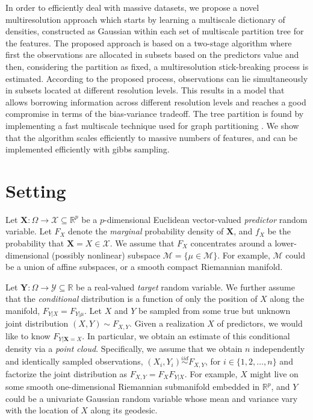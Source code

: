 \documentclass{article}
\newcommand{\iid}{\overset{iid}{\sim}}
\newcommand{\mbX}{\mathbf{X}}
\newcommand{\mbY}{\mathbf{Y}}
\newcommand{\Real}{\mathbb{R}}
\providecommand{\mc}[1]{\mathcal{#1}}
\newcommand{\from}{{\ensuremath{\colon}}}           %
\begin{document}
 In order to efficiently deal with massive datasets, we propose a novel multiresolution approach which starts by learning a multiscale dictionary of densities, constructed as Gaussian within each set of multiscale partition tree for the features. The proposed approach is based on a two-stage algorithm where first the observations are allocated in subsets based on the predictors value and then, considering the partition as fixed, a multiresolution stick-breaking process is estimated. According to the proposed process, observations can lie simultaneously in subsets located at different resolution levels. This results in a model that allows borrowing information across different resolution levels and reaches a good compromise in terms of the bias-variance tradeoff. The tree partition is found by implementing a fast multiscale technique used for graph partitioning \cite{metis}.  We show that the algorithm scales efficiently to massive numbers of features, and can be implemented efficiently with gibbs sampling. 



\section{Setting} %
Let $\mbX \from \Omega \to \mathcal{X} \subseteq \Real^p$ be a $p$-dimensional Euclidean vector-valued \emph{predictor} random variable.  Let $F_X$ denote the \emph{marginal} probability density of $\mbX$, and $f_X$ be the probability that  $\mbX=X \in \mc{X}$.  We assume that $F_X$ concentrates around a lower-dimensional (possibly nonlinear) subspace $\mc{M}=\{\mu \in \mc{M}\}$.  For example, $\mc{M}$ could be a union of affine subspaces, or a smooth compact Riemannian manifold.  

Let $\mbY \from \Omega \to  \mathcal{Y} \subseteq \Real$ be a real-valued \emph{target} random variable. We further assume that the \emph{conditional} distribution is a function of only the position of $X$ along the manifold, $F_{Y|X}=F_{Y|\mu}$. Let $X$ and $Y$ be sampled from some true but unknown joint distribution $(X,Y) \sim F_{X,Y}$.  Given a realization $X$ of predictors, we would like to know $F_{Y| \mbX=X}$.  In particular, we obtain an estimate of this conditional density via a \emph{point cloud}.  Specifically, we assume that we obtain $n$ independently and identically sampled observations, $(X_i,Y_i) \iid F_{X,Y}$, for $i \in \{1,2,\ldots,n\}$ and factorize the joint distribution  as $F_{X,Y}=F_X F_{Y|X}$.  
For example, $X$ might live on some smooth one-dimensional Riemannian submanifold embedded in $\Real^p$, and  $Y$ could be a univariate Gaussian random variable whose mean and variance vary with the location of $X$ along its geodesic.  
\end{document}
